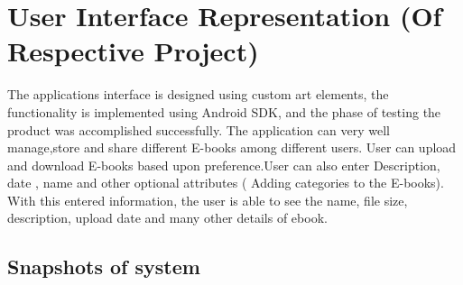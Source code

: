 \section{User Interface Representation (Of  Respective Project)}

The applications interface is designed using custom art elements, the functionality is implemented using Android SDK, and the phase of testing the product was accomplished successfully. The application can very well manage,store and share different E-books among different users. User can upload and download E-books based upon preference.User can also enter
Description, date , name  and other optional attributes ( Adding categories  to the E-books). With this entered information, the user is able to see the name, file size, description, upload date and many other details of ebook.


\subsection{Snapshots of system }


